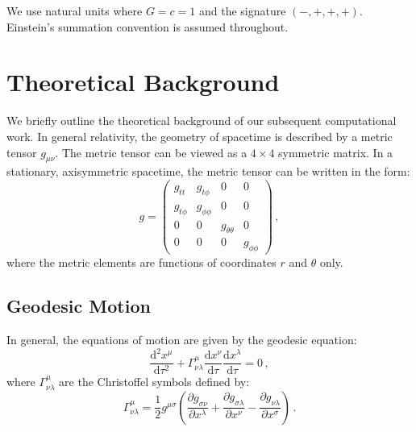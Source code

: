 \documentclass[11pt, twocolumn]{article}
\begin{document}
We use natural units where $G = c = 1$ and the signature $(-, +, +, +)$. Einstein's summation convention is assumed throughout.


\section{Theoretical Background} \label{sec:theory}


We briefly outline the theoretical background of our subsequent computational work. In general relativity, the geometry of spacetime is described by a metric tensor $g_{\mu\nu}$. The metric tensor can be viewed as a $4 \times 4$ symmetric matrix. In a stationary, axisymmetric spacetime, the metric tensor can be written in the form:
\begin{equation}
    g =
    \begin{pmatrix}
        g_{tt}    & g_{t\phi}    & 0                & 0            \\
        g_{t\phi} & g_{\phi\phi} & 0                & 0            \\
        0         & 0            & g_{\theta\theta} & 0            \\
        0         & 0            & 0                & g_{\phi\phi}
    \end{pmatrix} \, ,
\end{equation}
where the metric elements are functions of coordinates $r$ and $\theta$ only.


\subsection{Geodesic Motion}


In general, the equations of motion are given by the geodesic equation:
\begin{equation} \label{eq:geodesic}
    \frac{\mathrm{d}^2 x^{\mu}}{\mathrm{d}\tau^2} + \Gamma^{\mu}_{\nu\lambda} \frac{\mathrm{d} x^{\nu}}{\mathrm{d}\tau} \frac{\mathrm{d} x^{\lambda}}{\mathrm{d}\tau} = 0 \, ,
\end{equation}
where $\Gamma^{\mu}_{\nu\lambda}$ are the Christoffel symbols defined by:
\begin{equation}
    \Gamma^{\mu}_{\nu\lambda} = \frac{1}{2} g^{\mu\sigma} \left( \frac{\partial g_{\sigma\nu}}{\partial x^{\lambda}} + \frac{\partial g_{\sigma\lambda}}{\partial x^{\nu}} - \frac{\partial g_{\nu\lambda}}{\partial x^{\sigma}} \right) \, .
\end{equation}
\end{document}
